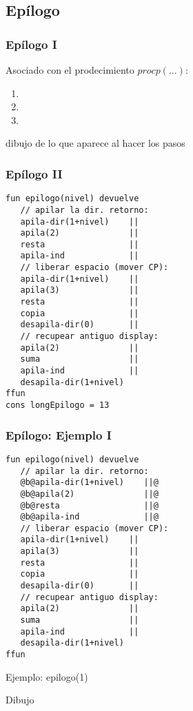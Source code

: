\documentclass[hyperref={pdfpagelabels=false},tree-dvips]{beamer}
\begin{document}
\subsection{Epílogo}
\begin{frame}[fragile]
\frametitle{Epílogo I}

Asociado con el prodecimiento $proc p(...)$:
\begin{enumerate}[<+->]
	\item
	\item
	\item
\end{enumerate}

dibujo de lo que aparece al hacer los pasos

\end{frame}
\begin{frame}[fragile]
\frametitle{Epílogo II}
\begin{lstlisting}[style=codigoMP,basicstyle=\scriptsize\ttfamily]
fun epilogo(nivel) devuelve
   // apilar la dir. retorno:
   apila-dir(1+nivel)    ||
   apila(2)              ||
   resta                 ||
   apila-ind             ||
   // liberar espacio (mover CP):
   apila-dir(1+nivel)    ||
   apila(3)              ||
   resta                 ||
   copia                 ||
   desapila-dir(0)       ||
   // recupear antiguo display:
   apila(2)              ||
   suma                  ||
   apila-ind             ||
   desapila-dir(1+nivel)
ffun
cons longEpilogo = 13
\end{lstlisting}

\end{frame}
\begin{frame}[fragile]
\frametitle{Epílogo: Ejemplo I}

\begin{lstlisting}[style=codigoMP,basicstyle=\tiny\ttfamily]
fun epilogo(nivel) devuelve
   // apilar la dir. retorno:
   @b@apila-dir(1+nivel)    ||@
   @b@apila(2)              ||@
   @b@resta                 ||@
   @b@apila-ind             ||@
   // liberar espacio (mover CP):
   apila-dir(1+nivel)    ||
   apila(3)              ||
   resta                 ||
   copia                 ||
   desapila-dir(0)       ||
   // recupear antiguo display:
   apila(2)              ||
   suma                  ||
   apila-ind             ||
   desapila-dir(1+nivel)
ffun
\end{lstlisting}

Ejemplo: epilogo(1)

Dibujo

\end{frame}
\end{document}
